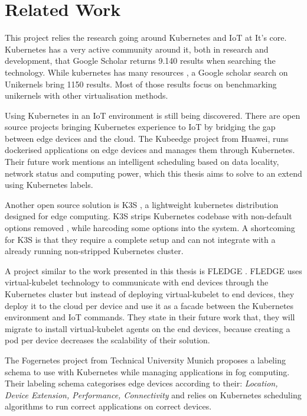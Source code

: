 
\chapter{Related Work}\label{chapter:literature}

This project relies the research going around Kubernetes and IoT at It's core. Kubernetes has a very active community around it, both in research and development, that Google Scholar returns 9.140 results when searching the technology. While kubernetes has many resources , a Google scholar search on Unikernels bring 1150 results. Most of those results focus on benchmarking unikernels with other virtualisation methods.

Using Kubernetes in an IoT environment is still being discovered. There are open source projects bringing Kubernetes experience to IoT by bridging the gap between edge devices and the cloud. The Kubeedge project \cite{kubeedge} from Huawei, runs dockerised applications on edge devices and manages them through Kubernetes. Their future work mentions an intelligent scheduling based on data locality, network status and computing power, which this thesis aims to solve to an extend using Kubernetes labels.

Another open source solution is K3S \cite{k3s}, a lightweight kubernetes distribution designed for edge computing. K3S strips Kubernetes codebase with non-default options removed , while harcoding some options into the system. A shortcoming for K3S is that they require a complete setup and can not integrate with a already running non-stripped Kubernetes cluster.

A project similar to the work presented in this thesis is FLEDGE \cite{fledge}. FLEDGE uses virtual-kubelet technology to communicate with end devices through the Kubernetes cluster but instead of deploying virtual-kubelet to end devices, they deploy it to the cloud per device and use it as a facade between the Kubernetes environment and IoT commands. They state in their future work that, they will migrate to install virtual-kubelet agents on the end devices, because creating a pod per device decreases the scalability of their solution.

The Fogernetes project\cite{fogernetes} from Technical University Munich proposes a labeling schema to use with Kubernetes while managing applications in fog computing. Their labeling schema categorises edge devices according to their: \textit{Location, Device Extension, Performance, Connectivity} and relies on Kubernetes scheduling algorithms to run correct applications on correct devices.

